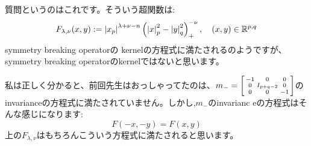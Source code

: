 \documentclass[10pt]{article} %
\begin{document}
\begin{CJK}{UTF8}{min}
質問というのはこれです。そういう超関数は:
\[F_{ \lambda,\nu }(x,y):=\left| x_p \right|^{ \lambda+\nu-n }\left( \left| x \right|^2_p-\left| y \right|^2_q \right)^{ -\nu }_+,\quad(x,y)\in\mathbb{R}^{ p,q }\]
symmetry breaking operatorの kernelの方程式に満たされるのようですが、symmetry breaking operatorのkernelではないと思います。

私は正しく分かると、前回先生はおっしゃってたのは、$m_-=\left[\begin{smallmatrix}-1&0&0\\
	0&I_{ p+q-2 }&0\\0&0&-1\end{smallmatrix}\right]$のinvarianceの方程式に満たされていません。しかし,$m_-$のinvarianc
eの方程式はそんな感じになります:
\[F(-x,-y)=F(x,y)\]
上の$F_{ \lambda,\nu }$はもちろんこういう方程式に満たされると思います。
\end{CJK}
\end{document}
